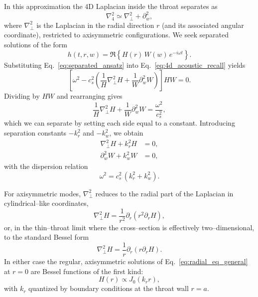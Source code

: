 \documentclass[12pt]{article}
\begin{document}
In this approximation the 4D Laplacian inside the throat separates as
\begin{equation}
  \nabla_4^2
  \simeq \nabla_{\perp}^2 + \partial_w^2,
\end{equation}
where $\nabla_{\perp}^2$ is the Laplacian in the radial direction $r$ (and
its associated angular coordinate), restricted to axisymmetric configurations.
We seek separated solutions of the form
\begin{equation}
  h(t,r,w) = \Re\!\left\{ H(r)\,W(w)\,e^{-i\omega t} \right\}.
  \label{eq:separated_ansatz}
\end{equation}
Substituting Eq.~\eqref{eq:separated_ansatz} into
Eq.~\eqref{eq:4d_acoustic_recall} yields
\begin{equation}
  \left[
    \omega^2
    - c_s^2\left(
        \frac{1}{H}\nabla_{\perp}^2 H
      + \frac{1}{W}\partial_w^2 W
      \right)
  \right] H W = 0.
\end{equation}
Dividing by $HW$ and rearranging gives
\begin{equation}
  \frac{1}{H}\nabla_{\perp}^2 H
  + \frac{1}{W}\partial_w^2 W
  = \frac{\omega^2}{c_s^2},
\end{equation}
which we can separate by setting each side equal to a constant.  Introducing
separation constants $-k_r^2$ and $-k_w^2$, we obtain
\begin{align}
  \nabla_{\perp}^2 H + k_r^2 H &= 0,
  \label{eq:radial_eq_general}
  \\
  \partial_w^2 W + k_w^2 W &= 0,
  \label{eq:axial_eq_general}
\end{align}
with the dispersion relation
\begin{equation}
  \omega^2 = c_s^2\,(k_r^2 + k_w^2).
  \label{eq:dispersion_relation}
\end{equation}

For axisymmetric modes, $\nabla_{\perp}^2$ reduces to the radial part of the
Laplacian in cylindrical--like coordinates,
\begin{equation}
  \nabla_{\perp}^2 H
  = \frac{1}{r^2}\partial_r\!\left(r^2 \partial_r H\right),
\end{equation}
or, in the thin--throat limit where the cross--section is effectively
two--dimensional, to the standard Bessel form
\begin{equation}
  \nabla_{\perp}^2 H
  = \frac{1}{r}\partial_r\!\left(r \partial_r H\right).
\end{equation}
In either case the regular, axisymmetric solutions of
Eq.~\eqref{eq:radial_eq_general} at $r=0$ are Bessel functions of the first
kind:
\begin{equation}
  H(r) \propto J_0(k_r r),
\end{equation}
with $k_r$ quantized by boundary conditions at the throat wall $r=a$.
\end{document}
